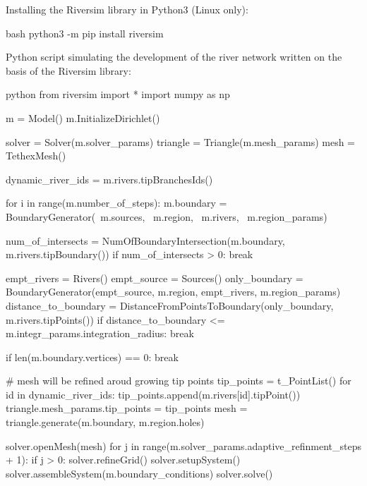 \documentclass[]{pracamgr}
\begin{document}
    Installing the Riversim library in Python3 (Linux only):
    
    \begin{mintedbox}{bash} 
      python3 -m pip install riversim\end{mintedbox}
    
    Python script simulating the development of the river network written on the basis of the Riversim library:

    \begin{mintedbox}{python} 
      from riversim import *
      import numpy as np

      m = Model()
      m.InitializeDirichlet()

      solver = Solver(m.solver_params)
      triangle = Triangle(m.mesh_params)
      mesh = TethexMesh()

      dynamic_river_ids = m.rivers.tipBranchesIds()

      for i in range(m.number_of_steps):
          m.boundary = BoundaryGenerator(\
              m.sources, \
              m.region, \
              m.rivers, \
              m.region_params)

          num_of_intersects = NumOfBoundaryIntersection(m.boundary, m.rivers.tipBoundary())
          if num_of_intersects > 0:
              break

          empt_rivers = Rivers()
          empt_source = Sources()
          only_boundary = BoundaryGenerator(empt_source, m.region, empt_rivers, m.region_params)
          distance_to_boundary = DistanceFromPointsToBoundary(only_boundary, m.rivers.tipPoints())
          if distance_to_boundary <= m.integr_params.integration_radius:
              break

          if len(m.boundary.vertices) == 0:
              break 

          # mesh will be refined aroud growing tip points
          tip_points = t_PointList()
          for id in dynamic_river_ids:
              tip_points.append(m.rivers[id].tipPoint())
          triangle.mesh_params.tip_points = tip_points
          mesh = triangle.generate(m.boundary, m.region.holes)
              
          solver.openMesh(mesh)
          for j in range(m.solver_params.adaptive_refinment_steps + 1):
              if j > 0:
                  solver.refineGrid()
              solver.setupSystem()
              solver.assembleSystem(m.boundary_conditions)
              solver.solve()


\end{mintedbox}
\end{document}
